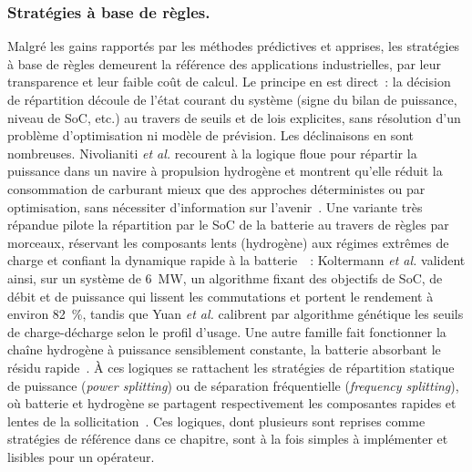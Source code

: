 \subsubsection{Stratégies à base de règles.}
Malgré les gains rapportés par les méthodes prédictives et apprises, les stratégies à base de règles demeurent la référence des applications industrielles, par leur transparence et leur faible coût de calcul.
Le principe en est direct~: la décision de répartition découle de l'état courant du système (signe du bilan de puissance, niveau de SoC, etc.) au travers de seuils et de lois explicites, sans résolution d'un problème d'optimisation ni modèle de prévision.
Les déclinaisons en sont nombreuses.
Nivolianiti \textit{et al.} recourent à la logique floue pour répartir la puissance dans un navire à propulsion hydrogène et montrent qu'elle réduit la consommation de carburant mieux que des approches déterministes ou par optimisation, sans nécessiter d'information sur l'avenir~\cite{nivolianiti_fuzzy_2024}.
Une variante très répandue pilote la répartition par le SoC de la batterie au travers de règles par morceaux, réservant les composants lents (hydrogène) aux régimes extrêmes de charge et confiant la dynamique rapide à la batterie~\cite{koltermann_improved_2024}\cite{yuan_real-time_2022}~: Koltermann \textit{et al.} valident ainsi, sur un système de 6~MW, un algorithme fixant des objectifs de SoC, de débit et de puissance qui lissent les commutations et portent le rendement à environ 82~\%, tandis que Yuan \textit{et al.} calibrent par algorithme génétique les seuils de charge-décharge selon le profil d'usage.
Une autre famille fait fonctionner la chaîne hydrogène à puissance sensiblement constante, la batterie absorbant le résidu rapide~\cite{wang_comparison_2020}.
À ces logiques se rattachent les stratégies de répartition statique de puissance (\textit{power splitting}) ou de séparation fréquentielle (\textit{frequency splitting}), où batterie et hydrogène se partagent respectivement les composantes rapides et lentes de la sollicitation~\cite{eldeeb_hybrid_2019}\cite{corapsiz_overview_2023}.
Ces logiques, dont plusieurs sont reprises comme stratégies de référence dans ce chapitre, sont à la fois simples à implémenter et lisibles pour un opérateur.

